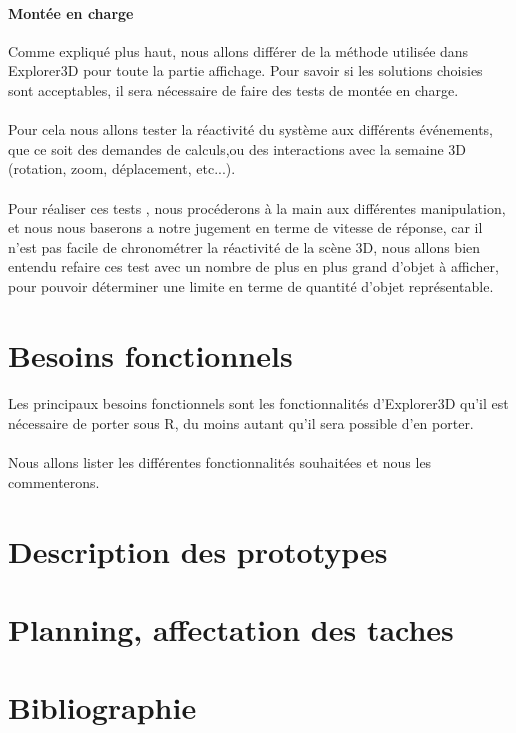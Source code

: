 \documentclass{article}
\begin{document}
\paragraph{Montée en charge} Comme expliqué plus haut, nous allons différer de la méthode utilisée dans Explorer3D pour toute la partie affichage. Pour savoir si les solutions choisies sont acceptables, il sera nécessaire de faire des tests de montée en charge.\paragraph{} Pour cela nous allons tester la réactivité du système aux différents événements, que ce soit des demandes de calculs,ou des interactions avec la semaine 3D (rotation, zoom, déplacement, etc...).\paragraph{} Pour réaliser ces tests , nous procéderons à la main aux différentes manipulation, et nous nous baserons a notre jugement en terme de vitesse de réponse, car il n'est pas facile de chronométrer la réactivité de la scène 3D, nous allons bien entendu refaire ces test avec un nombre de plus en plus grand d'objet à afficher, pour pouvoir déterminer une limite en terme de quantité d'objet représentable.
\newpage
\section{Besoins fonctionnels}
\paragraph{} Les principaux besoins fonctionnels sont les fonctionnalités d'Explorer3D qu'il est nécessaire de porter sous R, du moins autant qu'il sera possible d'en porter.
\paragraph{} Nous allons lister les différentes fonctionnalités souhaitées et nous les commenterons.
\newpage
\section{Description des prototypes}
\newpage
\section{Planning, affectation des taches}
\newpage
\section{Bibliographie} 
\end{document}
